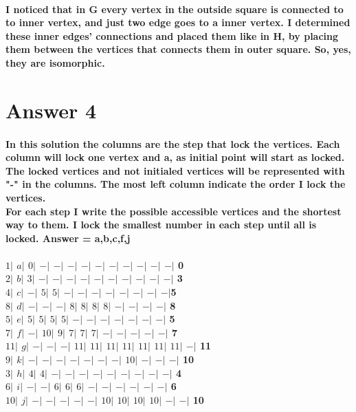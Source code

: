 \documentclass[12pt]{article}
\begin{document}
\paragraph{I noticed that in G every vertex in the outside square is connected to to inner vertex, and just two edge goes to a inner vertex. I determined these inner edges' connections and placed them like in H, by placing them between the vertices that connects them in outer square. So, yes, they are isomorphic.}

\section*{Answer 4}
\paragraph{In this solution the columns are the step that lock the vertices. Each column will lock one vertex and a, as initial point will start as locked. The locked vertices and not initialed vertices will be represented with "-" in the columns. The most left column indicate the order I lock the vertices.\\
For each step I write the possible accessible vertices and the shortest way to them. I lock the smallest number in each step until all is locked. Answer = a,b,c,f,j  }
\paragraph{$1 |$ $a |$ $0 |$ $ - |$ $- |$ $ - |$ $ - |$ $ - |$ $ - |$ $ - |$ $ - |$ $ - |$ $ - |$ 0 \\
$2 |$ $  b |$ $ 3 |$ $ - |$ $ - |$ $ - |$ $ - |$ $ - |$ $ - |$ $ - |$ $ - |$ $ - |$ $ - |$ 3 \\
$4 |$ $  c |$ $ - |$ $ 5 | $ $ 5 | $ $ - |$ $ - |$ $ - |$ $ - |$ $ - |$ $ - |$ $ - |$ $- |$5 \\
$8 |$ $  d |$ $ - |$ $ - |$ $ - |$ $ 8 |$ $ 8 |$ $ 8 |$ $ 8 |$ $ - |$ $ - |$ $ - |$ $ - |$ 8 \\
$5 |$ $  e |$ $ 5 |$ $ 5 |$ $ 5 |$ $ 5 |$ $ - |$ $ - |$ $ - |$ $ - |$ $ - |$ $ - |$ $ - |$ 5 \\
$7 |$ $  f |$ $ - |$ $ 10|$ $ 9 |$ $ 7 |$ $ 7 |$ $ 7 |$ $ - |$ $ - |$ $ - |$ $ - |$ $ - |$ 7 \\ 
$11|$ $  g |$ $ - |$ $ - |$ $ - |$ $ 11|$ $ 11|$ $ 11|$ $ 11|$ $ 11|$ $ 11|$ $ 11|$ $ - |$ 11 \\
$9 |$ $  k |$ $ - |$ $ - |$ $ - |$ $ - |$ $ - |$ $ - |$ $ - |$ $ 10|$ $ - |$ $ - |$ $ - |$ 10\\
$3 |$ $  h |$ $ 4 |$ $ 4 |$ $ - |$ $ - |$ $ - |$ $ - |$ $ - |$ $ - |$ $ - |$ $ - |$ $ - |$ 4 \\
$6 |$ $  i |$ $ - |$ $ - |$ $ 6 |$ $ 6 |$ $ 6 |$ $ - |$ $ - |$ $ - |$ $ - |$ $ - |$ $ - |$ 6 \\
$10|$ $  j |$ $ - |$ $ - |$ $ - |$ $ - |$ $ - |$ $ 10|$ $ 10|$ $ 10|$ $ 10|$ $ - |$ $ - |$ 10\\}
\end{document}
